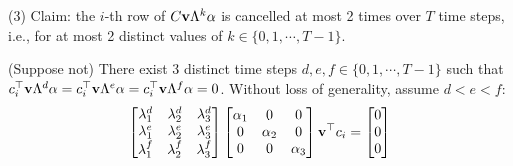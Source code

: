 {%
(3) Claim: the $i$-th row of $C{\bf v}\Lambda^k \alpha$ is cancelled at most 2 times over $T$ time steps, i.e., for at most 2 distinct values of $k \in \{0, 1, \cdots, T-1\}$. 
	
	(Suppose not) There exist 3 distinct time steps $d, e, f \in \{0, 1, \cdots, T-1\}$ such that $c_i^\top {\bf v} \Lambda^d \alpha = c_i^\top {\bf v} \Lambda^e \alpha = c_i^\top {\bf v} \Lambda^f \alpha = 0$. Without loss of generality, assume $d<e<f$:
	\begin{equation}
		\begin{bmatrix} \lambda_1^d & \lambda_2^d & \lambda_3^d \\
					\lambda_1^e & \lambda_2^e & \lambda_3^e \\
					\lambda_1^f & \lambda_2^f & \lambda_3^f 
		\end{bmatrix}
		\begin{bmatrix} \alpha_1 & 0 & 0 \\ 0 & \alpha_2 & 0 \\ 0 & 0 & \alpha_3 \end{bmatrix} {\bf v}^\top c_i 
		= \begin{bmatrix} 0 \\ 0 \\ 0 \end{bmatrix} \nonumber
	\end{equation}
	
}
